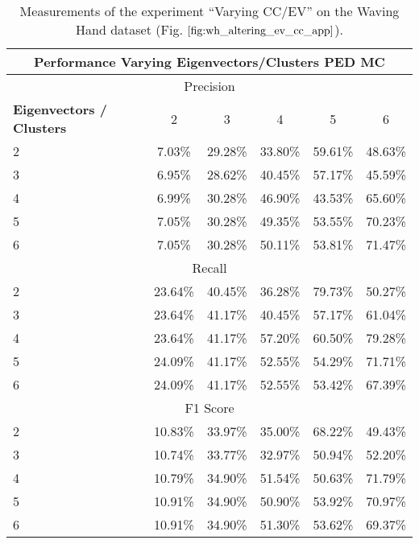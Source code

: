 \begin{table}[H]
\centering
\begin{tabular}{|l|c|c|c|c|c|}
\hline
\multicolumn{6}{|c|}{Performance Varying Eigenvectors/Clusters PED MC} \\ \hline
\multicolumn{6}{|c|}{Precision} \\ \hline
\textbf{Eigenvectors / Clusters} & 2 & 3 & 4 & 5 & 6 \\ \hline
2 & 7.03\% & 29.28\% & 33.80\% & 59.61\% & 48.63\%  \\ \hline
3 & 6.95\% & 28.62\% & 40.45\% & 57.17\% & 45.59\%  \\ \hline
4 & 6.99\% & 30.28\% & 46.90\% & 43.53\% & 65.60\%  \\ \hline
5 & 7.05\% & 30.28\% & 49.35\% & 53.55\% & 70.23\%  \\ \hline
6 & 7.05\% & 30.28\% & 50.11\% & 53.81\% & 71.47\%  \\ \hline
\multicolumn{6}{|c|}{Recall} \\ \hline
2 & 23.64\% & 40.45\% & 36.28\% & 79.73\% & 50.27\%  \\ \hline
3 & 23.64\% & 41.17\% & 40.45\% & 57.17\% & 61.04\%  \\ \hline
4 & 23.64\% & 41.17\% & 57.20\% & 60.50\% & 79.28\%  \\ \hline
5 & 24.09\% & 41.17\% & 52.55\% & 54.29\% & 71.71\%  \\ \hline
6 & 24.09\% & 41.17\% & 52.55\% & 53.42\% & 67.39\%  \\ \hline
\multicolumn{6}{|c|}{F1 Score} \\ \hline
2 & 10.83\% & 33.97\% & 35.00\% & 68.22\% & 49.43\%  \\ \hline
3 & 10.74\% & 33.77\% & 32.97\% & 50.94\% & 52.20\%  \\ \hline
4 & 10.79\% & 34.90\% & 51.54\% & 50.63\% & 71.79\%  \\ \hline
5 & 10.91\% & 34.90\% & 50.90\% & 53.92\% & 70.97\%  \\ \hline
6 & 10.91\% & 34.90\% & 51.30\% & 53.62\% & 69.37\%  \\ \hline
\end{tabular}
\caption[Performance Varying Eigenvector-Cluster]{Measurements of the experiment \enquote{Varying CC/EV} on the Waving Hand dataset (Fig. $\ref{fig:wh_altering_ev_cc_app}$).}
\label{tab:wh_ev_c}
\end{table}

